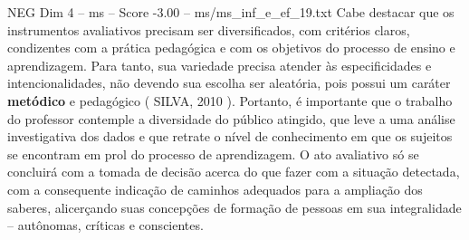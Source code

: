 \begin{textsample}{NEG Dim 4 – ms – Score -3.00 – ms/ms\_inf\_e\_ef\_19.txt}
Cabe destacar que os instrumentos avaliativos precisam ser diversificados, com critérios claros, condizentes com a prática pedagógica e com os objetivos do processo de ensino e aprendizagem.
Para tanto, sua variedade precisa atender às especificidades e intencionalidades, não devendo sua escolha ser aleatória, pois possui um caráter \textbf{metódico} e pedagógico ( SILVA, 2010 ).
Portanto, é importante que o trabalho do professor contemple a diversidade do público atingido, que leve a uma análise investigativa dos dados e que retrate o nível de conhecimento em que os sujeitos se encontram em prol do processo de aprendizagem.
O ato avaliativo só se concluirá com a tomada de decisão acerca do que fazer com a situação detectada, com a consequente indicação de caminhos adequados para a ampliação dos saberes, alicerçando suas concepções de formação de pessoas em sua integralidade – autônomas, críticas e conscientes.

\end{textsample}
